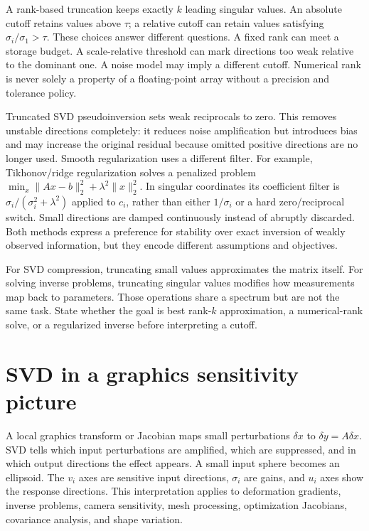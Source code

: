 A rank-based truncation keeps exactly \(k\) leading singular values. An absolute cutoff retains values above \(\tau\); a relative cutoff can retain values satisfying \(\sigma_i/\sigma_1>\tau\). These choices answer different questions. A fixed rank can meet a storage budget. A scale-relative threshold can mark directions too weak relative to the dominant one. A noise model may imply a different cutoff. Numerical rank is never solely a property of a floating-point array without a precision and tolerance policy.

Truncated SVD pseudoinversion sets weak reciprocals to zero. This removes unstable directions completely: it reduces noise amplification but introduces bias and may increase the original residual because omitted positive directions are no longer used. Smooth regularization uses a different filter. For example, Tikhonov/ridge regularization solves a penalized problem \(\min_x \|Ax-b\|_2^2+\lambda^2\|x\|_2^2\). In singular coordinates its coefficient filter is \(\sigma_i/(\sigma_i^2+\lambda^2)\) applied to \(c_i\), rather than either \(1/\sigma_i\) or a hard zero/reciprocal switch. Small directions are damped continuously instead of abruptly discarded. Both methods express a preference for stability over exact inversion of weakly observed information, but they encode different assumptions and objectives.

For SVD compression, truncating small values approximates the matrix itself. For solving inverse problems, truncating singular values modifies how measurements map back to parameters. Those operations share a spectrum but are not the same task. State whether the goal is best rank-\(k\) approximation, a numerical-rank solve, or a regularized inverse before interpreting a cutoff.

\section{SVD in a graphics sensitivity picture}\label{02-foundations-ii-ch024-svd-in-a-graphics-sensitivity-picture}

A local graphics transform or Jacobian maps small perturbations \(\delta x\) to \(\delta y=A\delta x\). SVD tells which input perturbations are amplified, which are suppressed, and in which output directions the effect appears. A small input sphere becomes an ellipsoid. The \(v_i\) axes are sensitive input directions, \(\sigma_i\) are gains, and \(u_i\) axes show the response directions. This interpretation applies to deformation gradients, inverse problems, camera sensitivity, mesh processing, optimization Jacobians, covariance analysis, and shape variation.

